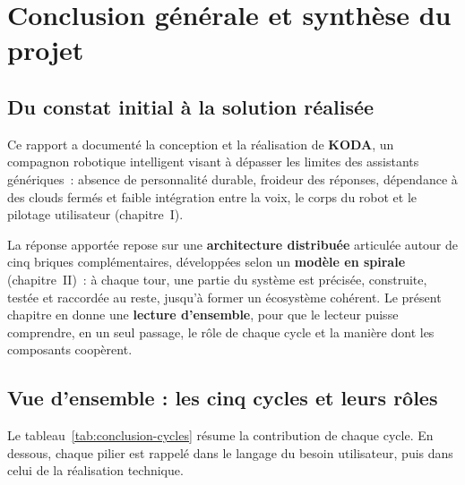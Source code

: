 \documentclass[a4paper,12pt]{report}
\begin{document}
	\chapter{Conclusion générale et synthèse du projet}
	
	\section{Du constat initial à la solution réalisée}
	
	Ce rapport a documenté la conception et la réalisation de \textbf{KODA}, un
	compagnon robotique intelligent visant à dépasser les limites des assistants
	génériques~: absence de personnalité durable, froideur des réponses, dépendance
	à des clouds fermés et faible intégration entre la voix, le corps du robot et le
	pilotage utilisateur (chapitre~I).
	
	La réponse apportée repose sur une \textbf{architecture distribuée} articulée
	autour de cinq briques complémentaires, développées selon un \textbf{modèle en
	spirale} (chapitre~II)~: à chaque tour, une partie du système est précisée,
	construite, testée et raccordée au reste, jusqu'à former un écosystème cohérent.
	Le présent chapitre en donne une \textbf{lecture d'ensemble}, pour que le lecteur
	puisse comprendre, en un seul passage, le rôle de chaque cycle et la manière dont
	les composants coopèrent.
	
	\section{Vue d'ensemble : les cinq cycles et leurs rôles}
	
	Le tableau~\ref{tab:conclusion-cycles} résume la contribution de chaque cycle.
	En dessous, chaque pilier est rappelé dans le langage du besoin utilisateur, puis
	dans celui de la réalisation technique.
	
\end{document}
